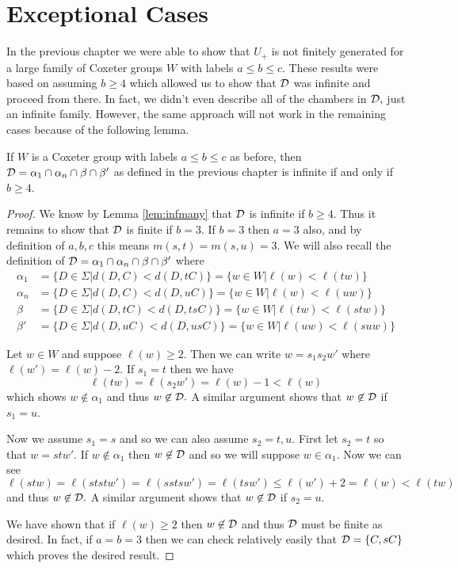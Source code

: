 \documentclass[class=book, crop=false]{standalone}
\begin{document}
\chapter{Exceptional Cases}
\label{exceptional}
In the previous chapter we were able to show that $U_+$ is not finitely generated for a large family of Coxeter groups $W$ with labels $a\le b\le c.$ These results were based on assuming $b\ge 4$ which allowed us to show that $\mathcal{D}$ was infinite and proceed from there. In fact, we didn't even describe all of the chambers in $\mathcal{D},$ just an infinite family. However, the same approach will not work in the remaining cases because of the following lemma.
\begin{lemma} If $W$ is a Coxeter group with labels $a\le b\le c$ as before, then $\mathcal{D}=\alpha_1\cap \alpha_n\cap \beta\cap \beta'$ as defined in the previous chapter is infinite if and only if $b\ge 4.$
	\label{lem:infD}
\end{lemma}
\begin{proof}
	We know by Lemma \ref{lem:infmany} that $\mathcal{D}$ is infinite if $b\ge 4.$ Thus it remains to show that $\mathcal{D}$ is finite if $b=3.$ If $b=3$ then $a=3$ also, and by definition of $a,b,c$ this means $m(s,t)=m(s,u)=3.$ We will also recall the definition of $\mathcal{D}=\alpha_1\cap \alpha_n\cap \beta \cap \beta'$ where
	\begin{align*}
	\alpha_1&=\{D\in \Sigma|d(D,C)<d(D,tC)\}=\{w\in W|\ell(w)<\ell(tw)\}\\
	\alpha_n&=\{D\in \Sigma|d(D,C)<d(D,uC)\}=\{w\in W|\ell(w)<\ell(uw)\}\\
	\beta&=\{D\in \Sigma|d(D,tC)<d(D,tsC)\}=\{w\in W|\ell(tw)<\ell(stw)\}\\
	\beta'&=\{D\in \Sigma|d(D,uC)<d(D,usC)\}=\{w\in W|\ell(uw)<\ell(suw)\}
\end{align*}

Let $w\in W$ and suppose $\ell(w)\ge 2.$ Then we can write $w=s_1s_2w'$ where $\ell(w')=\ell(w)-2.$ If $s_1=t$ then we have
\[
	\ell(tw)=\ell(s_2w')=\ell(w)-1<\ell(w)
\]
which shows $w\not\in \alpha_1$ and thus $w\not\in \mathcal{D}.$ A similar argument shows that $w\not\in \mathcal{D}$ if $s_1=u.$

Now we assume $s_1=s$ and so we can also assume $s_2=t,u.$ First let $s_2=t$ so that $w=stw'.$ If $w\not\in \alpha_1$ then $w\not\in \mathcal{D}$ and so we will suppose $w\in\alpha_1.$ Now we can see
\[
	\ell(stw)=\ell(ststw')=\ell(sstsw')=\ell(tsw')\le \ell(w')+2=\ell(w)<\ell(tw)
\]
and thus $w\not\in \mathcal{D}.$ A similar argument shows that $w\not\in \mathcal{D}$ if $s_2=u.$

We have shown that if $\ell(w)\ge 2$ then $w\not\in \mathcal{D}$ and thus $\mathcal{D}$ must be finite as desired. In fact, if $a=b=3$ then we can check relatively easily that $\mathcal{D}=\{C,sC\}$ which proves the desired result.
\end{proof}
\end{document}
